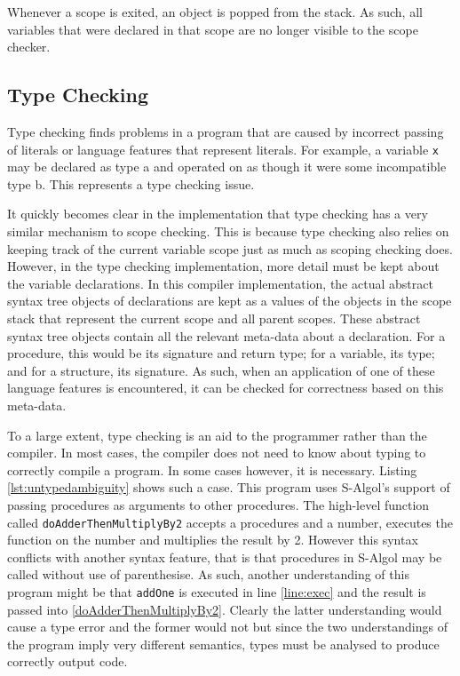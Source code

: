\documentclass{article}
\begin{document}
Whenever a scope is exited, an object is popped from the stack. As such, all variables that were declared in that scope are no longer visible to the scope checker.

\subsection{Type Checking}

Type checking finds problems in a program that are caused by incorrect passing of literals or language features that represent literals. For example, a variable \lstinline{x} may be declared as type a and operated on as though it were some incompatible type b. This represents a type checking issue.

It quickly becomes clear in the implementation that type checking has a very similar mechanism to scope checking. This is because type checking also relies on keeping track of the current variable scope just as much as scoping checking does. However, in the type checking implementation, more detail must be kept about the variable declarations. In this compiler implementation, the actual abstract syntax tree objects of declarations are kept as a values of the objects in the scope stack that represent the current scope and all parent scopes. These abstract syntax tree objects contain all the relevant meta-data about a declaration. For a procedure, this would be its signature and return type; for a variable, its type; and for a structure, its signature. As such, when an application of one of these language features is encountered, it can be checked for correctness based on this meta-data.

To a large extent, type checking is an aid to the programmer rather than the compiler. In most cases, the compiler does not need to know about typing to correctly compile a program. In some cases however, it is necessary. Listing \ref{lst:untypedambiguity} shows such a case. This program uses S-Algol's support of passing procedures as arguments to other procedures. The high-level function called \lstinline{doAdderThenMultiplyBy2} accepts a procedures and a number, executes the function on the number and multiplies the result by 2. However this syntax conflicts with another syntax feature, that is that procedures in S-Algol may be called without use of parenthesise. As such, another understanding of this program might be that \lstinline{addOne} is executed in line \ref{line:exec} and the result is passed into \ref{doAdderThenMultiplyBy2}. Clearly the latter understanding would cause a type error and the former would not but since the two understandings of the program imply very different semantics, types must be analysed to produce correctly output code.
\end{document}
